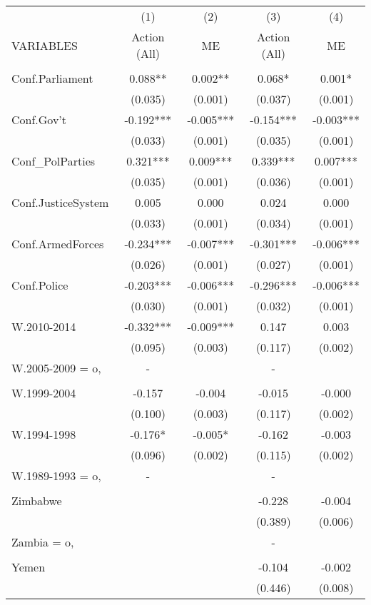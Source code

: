 \documentclass[]{article}
\begin{document}
\begin{tabular}{lcccc} \hline
 & (1) & (2) & (3) & (4) \\
VARIABLES & Action (All) & ME & Action (All) & ME \\ \hline
 &  &  &  &  \\
Conf.Parliament & 0.088** & 0.002** & 0.068* & 0.001* \\
 & (0.035) & (0.001) & (0.037) & (0.001) \\
Conf.Gov't & -0.192*** & -0.005*** & -0.154*** & -0.003*** \\
 & (0.033) & (0.001) & (0.035) & (0.001) \\
Conf\_PolParties & 0.321*** & 0.009*** & 0.339*** & 0.007*** \\
 & (0.035) & (0.001) & (0.036) & (0.001) \\
Conf.JusticeSystem & 0.005 & 0.000 & 0.024 & 0.000 \\
 & (0.033) & (0.001) & (0.034) & (0.001) \\
Conf.ArmedForces & -0.234*** & -0.007*** & -0.301*** & -0.006*** \\
 & (0.026) & (0.001) & (0.027) & (0.001) \\
Conf.Police & -0.203*** & -0.006*** & -0.296*** & -0.006*** \\
 & (0.030) & (0.001) & (0.032) & (0.001) \\
W.2010-2014 & -0.332*** & -0.009*** & 0.147 & 0.003 \\
 & (0.095) & (0.003) & (0.117) & (0.002) \\
W.2005-2009 = o, & - &  & - &  \\
 &  &  &  &  \\
W.1999-2004 & -0.157 & -0.004 & -0.015 & -0.000 \\
 & (0.100) & (0.003) & (0.117) & (0.002) \\
W.1994-1998 & -0.176* & -0.005* & -0.162 & -0.003 \\
 & (0.096) & (0.002) & (0.115) & (0.002) \\
W.1989-1993 = o, & - &  & - &  \\
 &  &  &  &  \\
Zimbabwe &  &  & -0.228 & -0.004 \\
 &  &  & (0.389) & (0.006) \\
Zambia = o, &  &  & - &  \\
 &  &  &  &  \\
Yemen &  &  & -0.104 & -0.002 \\
 &  &  & (0.446) & (0.008) \\

\end{tabular}
\end{document}

